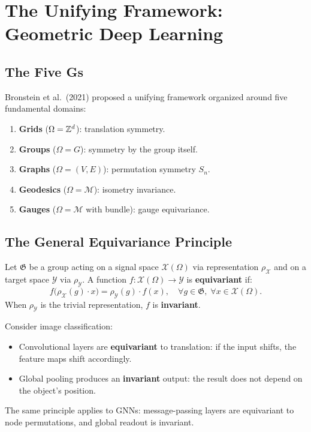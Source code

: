 \section{The Unifying Framework: Geometric Deep Learning}

\subsection{The Five Gs}

Bronstein et al.\ (2021) proposed a unifying framework organized around five
fundamental domains:

\begin{definition}
\begin{enumerate}
    \item \textbf{Grids} ($\Omega = \mathbb{Z}^d$): translation symmetry.
    \item \textbf{Groups} ($\Omega = G$): symmetry by the group itself.
    \item \textbf{Graphs} ($\Omega = (V,E)$): permutation symmetry $S_n$.
    \item \textbf{Geodesics} ($\Omega = \mathcal{M}$): isometry invariance.
    \item \textbf{Gauges} ($\Omega = \mathcal{M}$ with bundle): gauge equivariance.
\end{enumerate}
\end{definition}

\subsection{The General Equivariance Principle}

\begin{theorem}
Let $\mathfrak{G}$ be a group acting on a signal space
$\mathcal{X}(\Omega)$ via representation $\rho_{\mathcal{X}}$ and on a
target space $\mathcal{Y}$ via $\rho_{\mathcal{Y}}$. A function
$f: \mathcal{X}(\Omega) \to \mathcal{Y}$ is \textbf{equivariant} if:
\[
    f\bigl(\rho_{\mathcal{X}}(g) \cdot x\bigr) = \rho_{\mathcal{Y}}(g) \cdot f(x),
    \quad \forall g \in \mathfrak{G},\; \forall x \in \mathcal{X}(\Omega).
\]
When $\rho_{\mathcal{Y}}$ is the trivial representation, $f$ is
\textbf{invariant}.
\end{theorem}

\begin{intuition}[title=\textbf{Equivariance in pictures}]
Consider image classification:
\begin{itemize}
    \item Convolutional layers are \textbf{equivariant} to translation:
          if the input shifts, the feature maps shift accordingly.
    \item Global pooling produces an \textbf{invariant} output: the result
          does not depend on the object's position.
\end{itemize}
The same principle applies to GNNs: message-passing layers are equivariant
to node permutations, and global readout is invariant.
\end{intuition}

